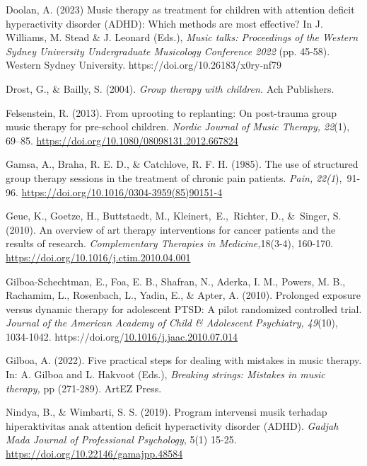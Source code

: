 \documentclass[authordate, empirical, issue]{jote-new-article}
\begin{document}
Doolan, A. (2023) Music therapy as treatment for children with attention deficit hyperactivity disorder (ADHD): Which methods are most effective? In J. Williams, M. Stead \& J. Leonard (Eds.), \emph{Music talks: Proceedings of the Western Sydney University Undergraduate Musicology Conference 2022} (pp. 45-58). Western Sydney University. https://doi.org/10.26183/x0ry-nf79



Drost, G., \& Bailly, S. (2004). \emph{Group therapy with children.} Ach Publishers.



Felsenstein, R. (2013). From uprooting to replanting: On post-trauma group music therapy for pre-school children. \emph{Nordic Journal of Music Therapy, 22}(1), 69--85. \href{https://doi.org/10.1080/08098131.2012.667824}{https://doi.org/10.1080/08098131.2012.667824}



Gamsa, A., Braha, R. E. D., \& Catchlove, R. F. H. (1985). The use of structured group therapy sessions in the treatment of chronic pain patients. \emph{Pain}\emph{,} \emph{22(1}), 91-96. \href{https://doi.org/10.1016/0304-3959(85)90151-4}{https://doi.org/10.1016/0304-3959(85)90151-4}



Geue, K., Goetze, H., Buttstaedt, M., Kleinert, E., Richter, D., \& Singer, S. (2010). An overview of art therapy interventions for cancer patients and the results of research. \emph{Complementary Therapies in Medicine}\emph{,}18(3-4), 160-170. \href{https://doi.org/10.1016/j.ctim.2010.04.001}{https://doi.org/10.1016/j.ctim.2010.04.001}



Gilboa-Schechtman, E., Foa, E. B., Shafran, N., Aderka, I. M., Powers, M. B., Rachamim, L., Rosenbach, L., Yadin, E., \& Apter, A. (2010). Prolonged exposure versus dynamic therapy for adolescent PTSD: A pilot randomized controlled trial. \emph{Journal of the American Academy of Child \& Adolescent Psychiatry, 49}(10), 1034-1042. https://doi.org/\href{https://doi.org/10.1016/j.jaac.2010.07.014}{10.1016/j.jaac.2010.07.014}



Gilboa, A. (2022). Five practical steps for dealing with mistakes in music therapy. In: A. Gilboa and L. Hakvoot (Eds.), \emph{Breaking strings: Mistakes in music therapy,} pp (271-289). ArtEZ Press.



Nindya, B., \& Wimbarti, S. S. (2019). Program intervensi musik terhadap hiperaktivitas anak attention deficit hyperactivity disorder (ADHD). \emph{Gadjah }\emph{Mada}\emph{ Journal of Professional Psychology}, 5(1) 15-25. \href{https://doi.org/10.22146/gamajpp.48584}{https://doi.org/10.22146/gamajpp.48584}
\end{document}
